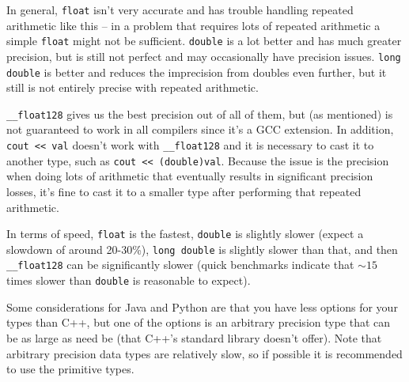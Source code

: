 In general, \texttt{float} isn't very accurate and has trouble handling repeated arithmetic like this -- in a problem that requires lots of repeated arithmetic a simple \texttt{float} might not be sufficient. \texttt{double} is a lot better and has much greater precision, but is still not perfect and may occasionally have precision issues. \texttt{long double} is better and reduces the imprecision from doubles even further, but it still is not entirely precise with repeated arithmetic.

\texttt{__float128} gives us the best precision out of all of them, but (as mentioned) is not guaranteed to work in all compilers since it's a GCC extension. In addition, \texttt{cout << val} doesn't work with \texttt{__float128} and it is necessary to cast it to another type, such as \texttt{cout << (double)val}. Because the issue is the precision when doing lots of arithmetic that eventually results in significant precision losses, it's fine to cast it to a smaller type after performing that repeated arithmetic.

In terms of speed, \texttt{float} is the fastest, \texttt{double} is slightly slower (expect a slowdown of around 20-30\%), \texttt{long double} is slightly slower than that, and then \texttt{__float128} can be significantly slower (quick benchmarks indicate that $\sim15$ times slower than \texttt{double} is reasonable to expect).

Some considerations for Java and Python are that you have less options for your types than C++, but one of the options is an arbitrary precision type that can be as large as need be (that C++'s standard library doesn't offer). Note that arbitrary precision data types are relatively slow, so if possible it is recommended to use the primitive types.
